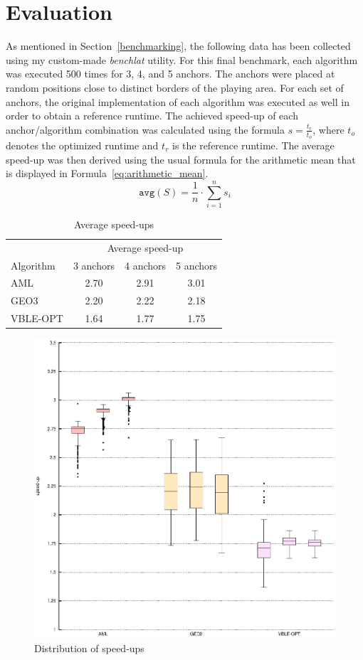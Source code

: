 \section{Evaluation}
\label{Evaluation}
As mentioned in Section~\ref{benchmarking}, the following data has been collected using my custom-made \emph{benchlat} utility. For this final benchmark, each algorithm was executed 500 times for 3, 4, and 5 anchors. The anchors were placed at random positions close to distinct borders of the playing area. For each set of anchors, the original implementation of each algorithm was executed as well in order to obtain a reference runtime. The achieved speed-up of each anchor/algorithm combination was calculated using the formula $s = \frac{t_{r}}{t_{o}}$, where $t_{o}$ denotes the optimized runtime and $t_{r}$ is the reference runtime. The average speed-up was then derived using the usual formula for the arithmetic mean that is displayed in Formula~\ref{eq:arithmetic_mean}.
\begin{equation}
\label{eq:arithmetic_mean}
\texttt{avg}(S) = \frac{1}{n} \cdot \sum_{i = 1}^n s_{i}
\end{equation}

\begin{table}
\begin{center}
\begin{tabular}{lccc} 
\toprule
& \multicolumn{3}{c}{Average speed-up} \\ 
\cmidrule(r){2-4}
Algorithm & 3 anchors & 4 anchors & 5 anchors \\
\midrule
AML & 2.70 & 2.91 & 3.01 \\
GEO3 & 2.20 & 2.22 & 2.18 \\ 
VBLE-OPT & 1.64 & 1.77& 1.75 \\
\bottomrule
\end{tabular}
\caption{Average speed-ups}
\label{average_table}
\end{center}
\end{table}


\begin{figure}[ht]
\begin{center}
\includegraphics[width=14cm]{img/boxplot}
\end{center}
\caption{Distribution of speed-ups}
\label{fig:boxplot}
\end{figure}